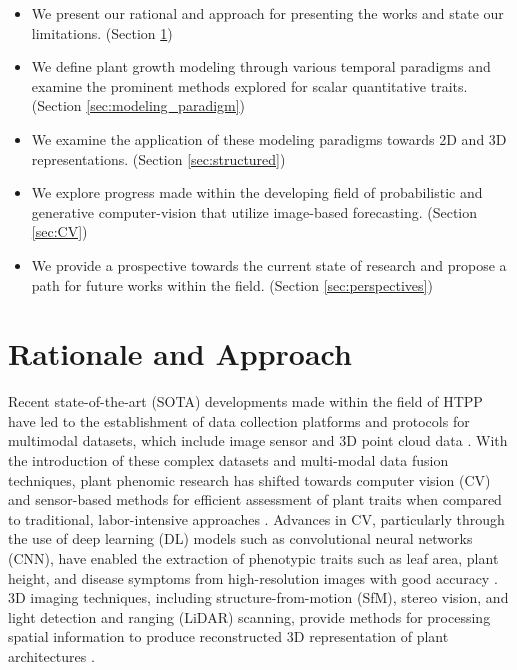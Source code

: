 \documentclass{article}
\begin{document}
\begin{itemize}
    \item We present our rational and approach for presenting the works and state our limitations. (Section \ref{Rationale})
    \item We define plant growth modeling through various temporal paradigms and examine the prominent methods explored for scalar quantitative traits. (Section \ref{sec:modeling_paradigm})
    \item We examine the application of these modeling paradigms towards 2D and 3D representations. (Section \ref{sec:structured})
    \item We explore progress made within the developing field of probabilistic and generative computer-vision that utilize image-based forecasting. (Section \ref{sec:CV})
    \item We provide a prospective towards the current state of research and propose a path for future works within the field. (Section \ref{sec:perspectives})
\end{itemize} 



\section{Rationale and Approach}\label{Rationale}
Recent state-of-the-art (SOTA) developments made within the field of HTPP have led to the establishment of data collection platforms and protocols for multimodal datasets, which include image sensor and 3D point cloud data \cite{walter2015plant,10.3389/fbioe.2020.623705,saric2022applications,plants11172199,WEN2023165626}. With the introduction of these complex datasets and multi-modal data fusion techniques, plant phenomic research has shifted towards computer vision (CV) and sensor-based methods for efficient assessment of plant traits when compared to traditional, labor-intensive approaches \cite{10.3389/fpls.2019.00508,10.1093/jxb/erz406}. Advances in CV, particularly through the use of deep learning (DL) models such as convolutional neural networks (CNN), have enabled the extraction of phenotypic traits such as leaf area, plant height, and disease symptoms from high-resolution images with good accuracy \cite{singh2016machine}. 3D imaging techniques, including structure-from-motion (SfM), stereo vision, and light detection and ranging (LiDAR) scanning, provide methods for processing spatial information to produce reconstructed 3D representation of plant architectures \cite{SUN2020195}. 
\end{document}
